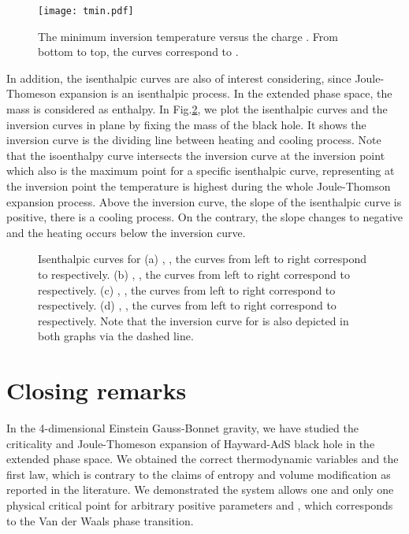 \documentclass[aps,11pt]{revtex4}
\begin{document}
\begin{figure}[htb]
\centering
\label{fig:subfig:tmin} \texttt{[image: tmin.pdf]}
\caption{The minimum inversion temperature  versus the charge . From bottom to top, the curves correspond to .}\label{figtmin}
\end{figure}

In addition, the isenthalpic curves are also of interest considering, since Joule-Thomeson expansion is an isenthalpic process. In the extended phase space, the mass is considered as enthalpy.
In Fig.\ref{fighag}, we plot the isenthalpic curves and the inversion curves in  plane by fixing the mass of the black hole. It shows the inversion curve is the dividing line between heating and cooling process. Note that the isoenthalpy curve intersects the inversion curve at the inversion point which also is the maximum point for a specific isenthalpic curve, representing at the inversion point the temperature is highest during the whole Joule-Thomson expansion process.  Above the inversion curve, the slope of the isenthalpic curve is positive, there is a cooling process. On the contrary, the slope changes to negative and the heating occurs below the inversion curve.

\begin{figure}[htb]
\centering
{}
\hfill
{}
\hfill
{}
\hfill
{}
\hfill
\caption{Isenthalpic curves for (a) , , the curves from left to right correspond to  respectively. (b) , , the curves from left to right correspond to  respectively. (c) , , the curves from left to right correspond to  respectively. (d) , , the curves from left to right correspond to  respectively. Note that the inversion curve for  is also depicted in both graphs via the dashed line.}\label{fighag}
\end{figure}


\section{Closing remarks}
\label{3s}

In the 4-dimensional Einstein Gauss-Bonnet gravity, we have studied the  criticality and Joule-Thomeson expansion of Hayward-AdS black hole in the extended phase space. We obtained the correct thermodynamic variables and the first law, which is contrary to the claims of entropy and volume modification as reported in the literature. We demonstrated the system allows one and only one physical critical point for arbitrary positive parameters  and , which corresponds to the Van der Waals phase transition.
\end{document}

